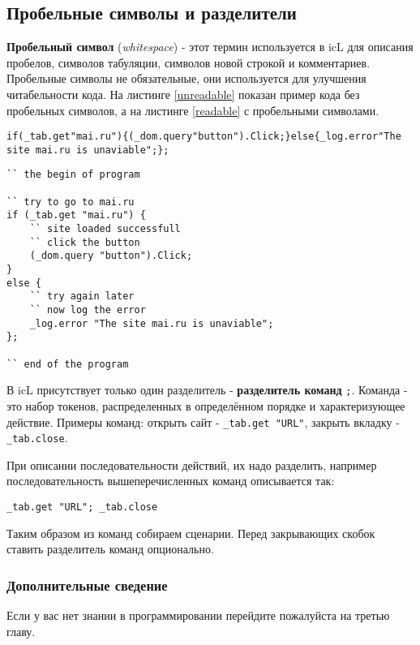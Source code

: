 \documentclass[a4paper, 14pt, russian]{extarticle}
\begin{document}
\subsection{Пробельные символы и разделители}
	
	\textbf{Пробельный символ} (\textit{whitespace}) - этот термин используется в icL для описания пробелов, символов табуляции, символов новой строкой и комментариев. Пробельные символы не обязательные, они используется для улучшения читабельности кода. На листинге \ref{unreadable} показан пример кода без пробельных символов, а на листинге \ref{readable} с пробельными символами.
	
\begin{lstlisting}[caption=Koд без пробельных символов,label=unreadable]
if(_tab.get"mai.ru"){(_dom.query"button").Click;}else{_log.error"The site mai.ru is unaviable";};
\end{lstlisting}
	
\begin{lstlisting}[caption=Koд с пробельных символов,label=readable]
`` the begin of program

`` try to go to mai.ru
if (_tab.get "mai.ru") {
	`` site loaded successfull
	`` click the button
	(_dom.query "button").Click;
}
else {
	`` try again later
	`` now log the error
	_log.error "The site mai.ru is unaviable";
};

`` end of the program
\end{lstlisting}
	
	В icL присутствует только один разделитель - \textbf{разделитель команд} \lstinline`;`. Команда - это набор токенов, распределенных в определённом порядке и характеризующее действие. Примеры команд: открыть сайт - \lstinline`_tab.get "URL"`, закрыть вкладку - \lstinline`_tab.close`.
	
	При описании последовательности действий, их надо разделить, например последовательность вышеперечисленных команд описывается так:	
\begin{lstlisting}[numbers=none]
_tab.get "URL"; _tab.close
\end{lstlisting} 
	
	Таким образом из команд собираем сценарии. Перед закрывающих скобок ставить разделитель команд опционально.
	
\subsubsection{Дополнительные сведение}
	
	Если у вас нет знании в программировании перейдите пожалуйста на третью главу.
	
\end{document}
